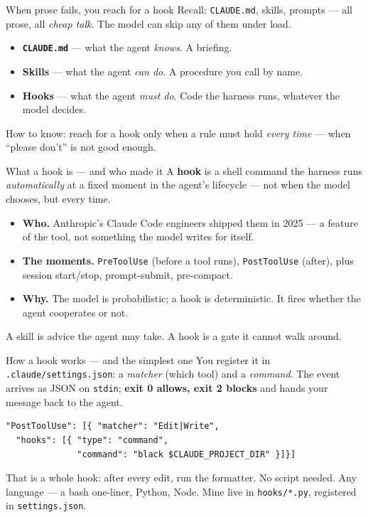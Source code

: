 \documentclass[aspectratio=169,11pt]{beamer}
\begin{document}
\begin{frame}{When prose fails, you reach for a hook}
Recall: \texttt{CLAUDE.md}, skills, prompts --- all prose, all \emph{cheap talk}. The model can skip any of them under load.
\vspace{0.3cm}
\begin{itemize}\setlength\itemsep{0.3em}
    \item \textbf{\texttt{CLAUDE.md}} --- what the agent \emph{knows}. A briefing.
    \item \textbf{Skills} --- what the agent \emph{can do}. A procedure you call by name.
    \item \textbf{Hooks} --- what the agent \emph{must do}. Code the harness runs, whatever the model decides.
\end{itemize}
\vspace{0.25cm}
\alert{How to know: reach for a hook only when a rule must hold \emph{every time} --- when ``please don't'' is not good enough.}
\end{frame}

\begin{frame}{What a hook is --- and who made it}
A \textbf{hook} is a shell command the harness runs \emph{automatically} at a fixed moment in the agent's lifecycle --- not when the model chooses, but every time.
\vspace{0.3cm}
\begin{itemize}\setlength\itemsep{0.28em}
    \item \textbf{Who.} Anthropic's Claude Code engineers shipped them in 2025 --- a feature of the tool, not something the model writes for itself.
    \item \textbf{The moments.} \texttt{PreToolUse} (before a tool runs), \texttt{PostToolUse} (after), plus session start/stop, prompt-submit, pre-compact.
    \item \textbf{Why.} The model is probabilistic; a hook is deterministic. It fires whether the agent cooperates or not.
\end{itemize}
\vspace{0.15cm}
\alert{A skill is advice the agent may take. A hook is a gate it cannot walk around.}
\end{frame}

\begin{frame}[fragile]{How a hook works --- and the simplest one}
You register it in \texttt{.claude/settings.json}: a \emph{matcher} (which tool) and a \emph{command}. The event arrives as JSON on \texttt{stdin}; \textbf{exit 0 allows, exit 2 blocks} and hands your message back to the agent.
\vspace{0.15cm}
\begin{verbatim}
"PostToolUse": [{ "matcher": "Edit|Write",
  "hooks": [{ "type": "command",
              "command": "black $CLAUDE_PROJECT_DIR" }]}]
\end{verbatim}
\vspace{0.05cm}
That is a whole hook: after every edit, run the formatter. No script needed.
\vspace{0.15cm}
\alert{Any language --- a bash one-liner, Python, Node. Mine live in \texttt{hooks/*.py}, registered in \texttt{settings.json}.}
\end{frame}
\end{document}
